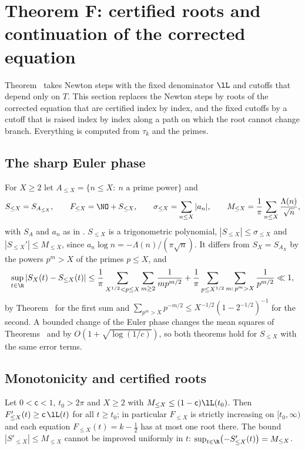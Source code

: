 \section{Theorem F: certified roots and continuation of the corrected equation}
\label{sec:certified}

Theorem~ takes Newton steps with the fixed denominator $\lL$ and cutoffs that depend only on $T$. This section replaces the Newton steps by roots of the corrected equation that are certified index by index, and the fixed cutoffs by a cutoff that is raised index by index along a path on which the root cannot change branch. Everything is computed from $\tau_k$ and the primes.

\subsection{The sharp Euler phase}
\label{subsec:sharp_phase}
For $X\ge2$ let $A_{\le X}=\{n\le X:\ n\text{ a prime power}\}$ and
\begin{equation}
S_{\le X}=S_{A_{\le X}},\qquad F_{\le X}=\NO+S_{\le X},\qquad \sigma_{\le X}=\sum_{n\le X}|a_n|,\qquad M_{\le X}=\frac1\pi\sum_{n\le X}\frac{\Lambda(n)}{\sqrt n},
\label{eq:sharp_def}
\end{equation}
with $S_A$ and $a_n$ as in . $S_{\le X}$ is a trigonometric polynomial, $|S_{\le X}|\le\sigma_{\le X}$ and $|S_{\le X}'|\le M_{\le X}$, since $a_n\log n=-\Lambda(n)/(\pi\sqrt n)$. It differs from $S_X=S_{A_X}$ by the powers $p^m>X$ of the primes $p\le X$, and
\begin{equation}
\sup_{t\in\R}|S_X(t)-S_{\le X}(t)|\le\frac1\pi\sum_{X^{1/2}<p\le X}\sum_{m\ge2}\frac1{mp^{m/2}}+\frac1\pi\sum_{p\le X^{1/2}}\sum_{m:\,p^m>X}\frac1{p^{m/2}}\ll1,
\label{eq:sharp_vs_full}
\end{equation}
by Theorem~ for the first sum and $\sum_{p^m>X}p^{-m/2}\le X^{-1/2}(1-2^{-1/2})^{-1}$ for the second. A bounded change of the Euler phase changes the mean squares of Theorems~ and  by $O(1+\sqrt{\log(1/c)})$, so both theorems hold for $S_{\le X}$ with the same error terms.

\subsection{Monotonicity and certified roots}
\begin{lemma}\label{lem:monotone_sharp}
Let $0<\mathsf c<1$, $t_0>2\pi$ and $X\ge2$ with $M_{\le X}\le(1-\mathsf c)\lL(t_0)$. Then $F_{\le X}'(t)\ge\mathsf c\,\lL(t)$ for all $t\ge t_0$; in particular $F_{\le X}$ is strictly increasing on $[t_0,\infty)$ and each equation $F_{\le X}(t)=k-\frac12$ has at most one root there. The bound $|S'_{\le X}|\le M_{\le X}$ cannot be improved uniformly in $t$: $\sup_{t\in\R}\bigl(-S'_{\le X}(t)\bigr)=M_{\le X}$.
\end{lemma}

